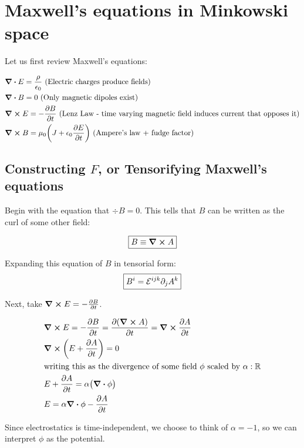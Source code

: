 \chapter{Maxwell's equations in Minkowski space}

Let us first review Maxwell's equations:

\begin{align*}
&\div E = \frac{\rho}{\epsilon_0}~\text{(Electric charges produce fields)}\\
&\div B = 0~\text{(Only magnetic dipoles exist)}\\
&\curl E = - \pdv{B}{t}~\text{(Lenz Law - time varying magnetic field induces current that opposes it)} \\
&\curl B =  \mu_0 \bigg(J + \epsilon_0 \pdv{E}{t} \bigg)~\text{(Ampere's law + fudge factor)}
\end{align*}

\section{Constructing $F$, or Tensorifying Maxwell's equations}

Begin with the equation that $\div B = 0$. This tells that $B$ can be written
as the curl of some other field:

\begin{equation}
    \boxed{B \equiv \curl A}
\end{equation}

Expanding this equation of $B$ in tensorial form:
\begin{equation}
    \boxed{ B^i = \mathcal{E}^{ijk}  \partial_j A^k }
\end{equation}

Next, take $\curl E = - \pdv{B}{t}$.


\begin{align*}
&\curl E = - \pdv{B}{t} = \pdv{(\curl A)}{t} = \curl{\pdv{A}{t}} \\
&\curl (E + \pdv{A}{t}) = 0 \\
&\text{writing this as the divergence of some field $\phi$ scaled by $\alpha : \mathbb{R}$} \\
&E + \pdv{A}{t} = \alpha \big(\div \phi\big) \\
&E = \alpha \div \phi - \pdv{A}{t}
\end{align*}

Since electrostatics is time-independent, we choose to think of $\alpha = -1$, 
so we can interpret $\phi$ as the potential.


